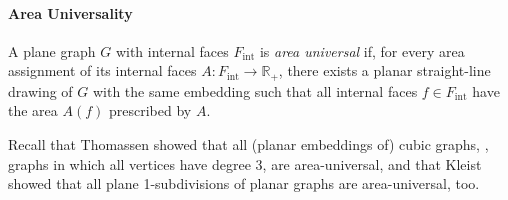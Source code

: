 \paragraph{Area Universality}

A plane graph $G$ with internal faces $F_\text{int}$ is \emph{area universal} if, for every area assignment of its internal faces $A \colon F_\text{int} \to \mathbb{R}_+$, there exists a planar straight-line drawing of $G$ with the same embedding such that all internal faces $f \in F_\text{int}$ have the area $A(f)$ prescribed by $A$.

Recall that Thomassen \cite{thomassen1992plane} showed that all (planar embeddings of) cubic graphs, \ie{}, graphs in which all vertices have degree 3, are area-universal, and that Kleist \cite{kleist2019planar} showed that all plane 1-subdivisions of planar graphs are area-universal, too.
